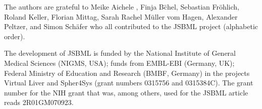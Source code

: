 The authors are grateful to Meike Aichele , Finja B\"chel, Sebastian
Fr\"ohlich, Roland Keller, Florian Mittag, Sarah Rachel M\"uller vom Hagen,
Alexander Peltzer, and Simon Sch\"afer who all contributed to the JSBML project
(alphabetic order).

The development of JSBML is funded by the National Institute of General Medical
Sciences (NIGMS, USA); funds from EMBL-EBI (Germany, UK); Federal Ministry of
Education and Research (BMBF, Germany) in the projects Virtual Liver and
Spher4Sys (grant numbers 0315756 and 0315384C). The grant number for the NIH
grant that was, among others, used for the JSBML article reads 2R01GM070923.

